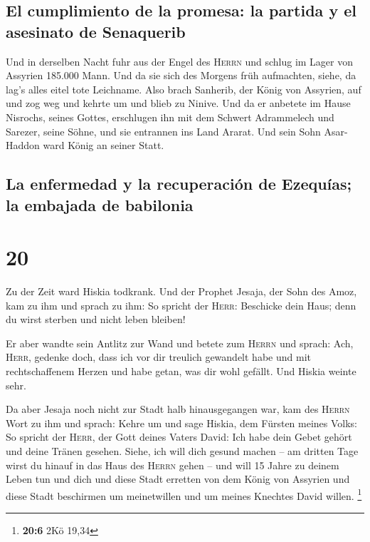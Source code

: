 \hypertarget{el-cumplimiento-de-la-promesa-la-partida-y-el-asesinato-de-senaquerib}{%
\subsection{El cumplimiento de la promesa: la partida y el asesinato de
Senaquerib}\label{el-cumplimiento-de-la-promesa-la-partida-y-el-asesinato-de-senaquerib}}

 Und in derselben Nacht fuhr aus der Engel des
\textsc{Herrn} und schlug im Lager von Assyrien 185.000 Mann. Und da sie
sich des Morgens früh aufmachten, siehe, da lag's alles eitel tote
Leichname.  Also brach Sanherib, der König von Assyrien,
auf und zog weg und kehrte um und blieb zu Ninive.  Und
da er anbetete im Hause Nisrochs, seines Gottes, erschlugen ihn mit dem
Schwert Adrammelech und Sarezer, seine Söhne, und sie entrannen ins Land
Ararat. Und sein Sohn Asar-Haddon ward König an seiner Statt.

\hypertarget{la-enfermedad-y-la-recuperaciuxf3n-de-ezequuxedas-la-embajada-de-babilonia}{%
\subsection{La enfermedad y la recuperación de Ezequías; la embajada de
babilonia}\label{la-enfermedad-y-la-recuperaciuxf3n-de-ezequuxedas-la-embajada-de-babilonia}}

\hypertarget{section-19}{%
\section{20}\label{section-19}}

 Zu der Zeit ward Hiskia todkrank. Und der Prophet Jesaja,
der Sohn des Amoz, kam zu ihm und sprach zu ihm: So spricht der
\textsc{Herr}: Beschicke dein Haus; denn du wirst sterben und nicht
leben bleiben!

 Er aber wandte sein Antlitz zur Wand und betete zum
\textsc{Herrn} und sprach:  Ach, \textsc{Herr}, gedenke
doch, dass ich vor dir treulich gewandelt habe und mit rechtschaffenem
Herzen und habe getan, was dir wohl gefällt. Und Hiskia weinte sehr.

 Da aber Jesaja noch nicht zur Stadt halb hinausgegangen
war, kam des \textsc{Herrn} Wort zu ihm und sprach:  Kehre
um und sage Hiskia, dem Fürsten meines Volks: So spricht der
\textsc{Herr}, der Gott deines Vaters David: Ich habe dein Gebet gehört
und deine Tränen gesehen. Siehe, ich will dich gesund machen -- am
dritten Tage wirst du hinauf in das Haus des \textsc{Herrn} gehen --
 und will 15 Jahre zu deinem Leben tun und dich und diese
Stadt erretten von dem König von Assyrien und diese Stadt beschirmen um
meinetwillen und um meines Knechtes David willen. \footnote{\textbf{20:6}
  2Kö 19,34}

